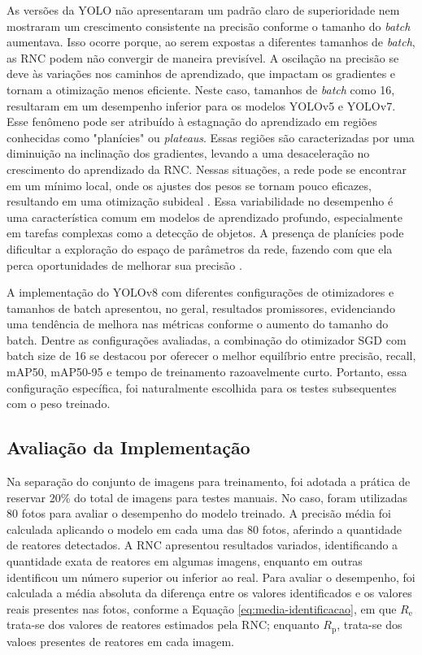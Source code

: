 As versões da YOLO não apresentaram um padrão claro de superioridade nem mostraram um crescimento consistente na precisão conforme o tamanho do \textit{batch} aumentava. Isso ocorre porque, ao serem expostas a diferentes tamanhos de \textit{batch}, as RNC podem não convergir de maneira previsível. A oscilação na precisão se deve às variações nos caminhos de aprendizado, que impactam os gradientes e tornam a otimização menos eficiente. Neste caso, tamanhos de \textit{batch} como 16, resultaram em um desempenho inferior para os modelos YOLOv5 e YOLOv7. Esse fenômeno pode ser atribuído à estagnação do aprendizado em regiões conhecidas como "planícies" ou \textit{plateaus}. Essas regiões são caracterizadas por uma diminuição na inclinação dos gradientes, levando a uma desaceleração no crescimento do aprendizado da RNC. Nessas situações, a rede pode se encontrar em um mínimo local, onde os ajustes dos pesos se tornam pouco eficazes, resultando em uma otimização subideal \cite{theorangeduck_minima_saddle}. Essa variabilidade no desempenho é uma característica comum em modelos de aprendizado profundo, especialmente em tarefas complexas como a detecção de objetos. A presença de planícies pode dificultar a exploração do espaço de parâmetros da rede, fazendo com que ela perca oportunidades de melhorar sua precisão \cite{goodfellow2016deep}.

A implementação do YOLOv8 com diferentes configurações de otimizadores e tamanhos de batch apresentou, no geral, resultados promissores, evidenciando uma tendência de melhora nas métricas conforme o aumento do tamanho do batch. Dentre as configurações avaliadas, a combinação do otimizador SGD com batch size de 16 se destacou por oferecer o melhor equilíbrio entre precisão, recall, mAP50, mAP50-95 e tempo de treinamento razoavelmente curto. Portanto, essa configuração específica, foi naturalmente escolhida para os testes subsequentes com o peso treinado.

\subsection{Avaliação da Implementação}

Na separação do conjunto de imagens para treinamento, foi adotada a prática de reservar 20\% do total de imagens para testes manuais. No caso, foram utilizadas 80 fotos para avaliar o desempenho do modelo treinado. A precisão média foi calculada aplicando o modelo em cada uma das 80 fotos, aferindo a quantidade de reatores detectados. A RNC apresentou resultados variados, identificando a quantidade exata de reatores em algumas imagens, enquanto em outras identificou um número superior ou inferior ao real. Para avaliar o desempenho, foi calculada a média absoluta da diferença entre os valores identificados e os valores reais presentes nas fotos, conforme a Equação \eqref{eq:media-identificacao}, em que \( R_{\text{e}} \) trata-se dos valores de reatores estimados pela RNC; enquanto \( R_{\text{p}} \), trata-se dos valoes presentes de reatores em cada imagem.

